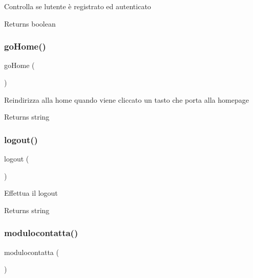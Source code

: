 Controlla se l\textquotesingle{}utente è registrato ed autenticato

\begin{DoxyReturn}{Returns}
boolean 
\end{DoxyReturn}
\mbox{\label{class_c_registrazione_a6b0bd8f7f5761d0f1a61f4dfb7770a62}} 
\subsubsection{\texorpdfstring{go\+Home()}{goHome()}}
{\footnotesize\ttfamily go\+Home (\begin{DoxyParamCaption}{ }\end{DoxyParamCaption})}

Reindirizza alla home quando viene cliccato un tasto che porta alla homepage

\begin{DoxyReturn}{Returns}
string 
\end{DoxyReturn}
\mbox{\label{class_c_registrazione_a082405d89acd6835c3a7c7a08a7adbab}} 
\subsubsection{\texorpdfstring{logout()}{logout()}}
{\footnotesize\ttfamily logout (\begin{DoxyParamCaption}{ }\end{DoxyParamCaption})}

Effettua il logout

\begin{DoxyReturn}{Returns}
string 
\end{DoxyReturn}
\mbox{\label{class_c_registrazione_a25af891e9bcd187b61f857f6ebd6fc08}} 
\subsubsection{\texorpdfstring{modulocontatta()}{modulocontatta()}}
{\footnotesize\ttfamily modulocontatta (\begin{DoxyParamCaption}{ }\end{DoxyParamCaption})}

